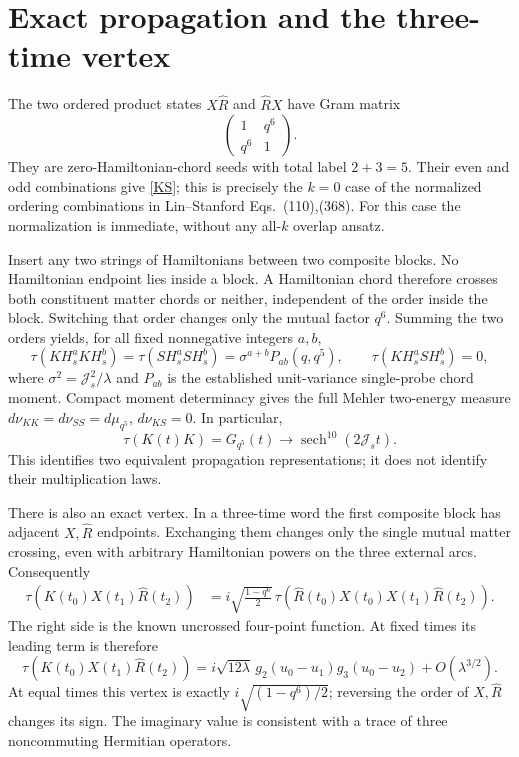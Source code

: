 \documentclass[11pt,a4paper]{article}
\newcommand{\Js}{\mathcal J_s}
\newcommand{\Rh}{\widehat R}
\newcommand{\av}[1]{\tau\!\left(#1\right)}
\DeclareMathOperator{\sech}{sech}
\begin{document}
\newpage
\section{Exact propagation and the three-time vertex}
The two ordered product states $X\Rh$ and $\Rh X$ have Gram matrix
\begin{equation}
 \begin{pmatrix}1&q^6\\q^6&1\end{pmatrix}.
\end{equation}
They are zero-Hamiltonian-chord seeds with total label $2+3=5$.
Their even and odd combinations give \eqref{KS}; this is precisely the
$k=0$ case of the normalized ordering combinations in Lin--Stanford
Eqs.~(110),(368). For this case the normalization is immediate, without
any all-$k$ overlap ansatz.

Insert any two strings of Hamiltonians between two composite blocks.
No Hamiltonian endpoint lies inside a block. A Hamiltonian chord
therefore crosses both constituent matter chords or neither, independent
of the order inside the block. Switching that order changes only the
mutual factor $q^6$. Summing the two orders yields, for all fixed
nonnegative integers $a,b$,
\begin{equation}
 \av{K H_s^a K H_s^b}=\av{S H_s^a S H_s^b}
 =\sigma^{a+b}P_{ab}(q,q^5),\qquad
 \av{K H_s^a S H_s^b}=0,\label{all}
\end{equation}
where $\sigma^2=\Js^2/\lambda$ and $P_{ab}$ is the established
unit-variance single-probe chord moment. Compact moment determinacy
gives the full Mehler two-energy measure $d\nu_{KK}=d\nu_{SS}=d\mu_{q^5}$,
$d\nu_{KS}=0$. In particular,
\begin{equation}
 \av{K(t)K}=G_{q^5}(t)\longrightarrow\sech^{10}(2\Js t).
\end{equation}
This identifies two equivalent propagation representations; it does
not identify their multiplication laws.

There is also an exact vertex. In a three-time word the first composite
block has adjacent $X,\Rh$ endpoints. Exchanging them changes only the
single mutual matter crossing, even with arbitrary Hamiltonian powers
on the three external arcs. Consequently
\begin{align}
 \av{K(t_0)X(t_1)\Rh(t_2)}
 &=i\sqrt{\frac{1-q^6}{2}}\,
   \av{\Rh(t_0)X(t_0)X(t_1)\Rh(t_2)}.\label{vertex}
\end{align}
The right side is the known uncrossed four-point function. At fixed
times its leading term is therefore
\begin{equation}
 \boxed{\av{K(t_0)X(t_1)\Rh(t_2)}
 =i\sqrt{12\lambda}\,g_2(u_0-u_1)g_3(u_0-u_2)
      +O(\lambda^{3/2}).}\label{cubic}
\end{equation}
At equal times this vertex is exactly $i\sqrt{(1-q^6)/2}$; reversing
the order of $X,\Rh$ changes its sign. The imaginary value is consistent
with a trace of three noncommuting Hermitian operators.
\end{document}
